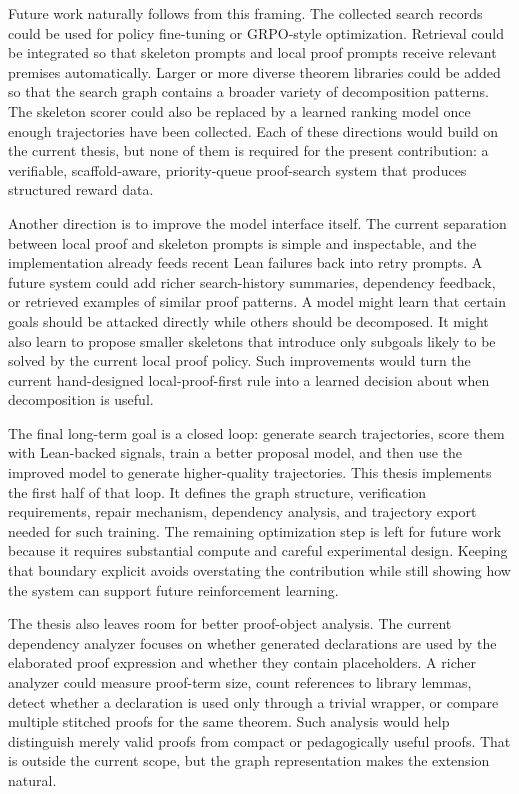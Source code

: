 \documentclass[en]{uet_awesome_thesis/uet-awesome-thesis}
\begin{document}
Future work naturally follows from this framing. The collected search records could be used for policy fine-tuning or GRPO-style optimization. Retrieval could be integrated so that skeleton prompts and local proof prompts receive relevant premises automatically. Larger or more diverse theorem libraries could be added so that the search graph contains a broader variety of decomposition patterns. The skeleton scorer could also be replaced by a learned ranking model once enough trajectories have been collected. Each of these directions would build on the current thesis, but none of them is required for the present contribution: a verifiable, scaffold-aware, priority-queue proof-search system that produces structured reward data.

Another direction is to improve the model interface itself. The current separation between local proof and
skeleton prompts is simple and inspectable, and the implementation already feeds recent Lean failures
back into retry prompts. A future system could add richer search-history summaries, dependency
feedback, or retrieved examples of similar proof patterns. A model
might learn that certain goals should be attacked directly while others should be decomposed. It might
also learn to propose smaller skeletons that introduce only subgoals likely to be solved by the current
local proof policy. Such improvements would turn the current hand-designed local-proof-first rule into a learned
decision about when decomposition is useful.

The final long-term goal is a closed loop: generate search trajectories, score them with Lean-backed
signals, train a better proposal model, and then use the improved model to generate higher-quality
trajectories. This thesis implements the first half of that loop. It defines the graph structure, verification
requirements, repair mechanism, dependency analysis, and trajectory export needed for such training. The
remaining optimization step is left for future work because it requires substantial compute and careful
experimental design. Keeping that boundary explicit avoids overstating the contribution while still
showing how the system can support future reinforcement learning.

The thesis also leaves room for better proof-object analysis. The current dependency analyzer focuses on
whether generated declarations are used by the elaborated proof expression and whether they contain
placeholders. A richer analyzer could measure proof-term size, count references to library lemmas, detect
whether a declaration is used only through a trivial wrapper, or compare multiple stitched proofs for the
same theorem. Such analysis would help distinguish merely valid proofs from compact or pedagogically
useful proofs. That is outside the current scope, but the graph representation makes the extension
natural.
\end{document}
